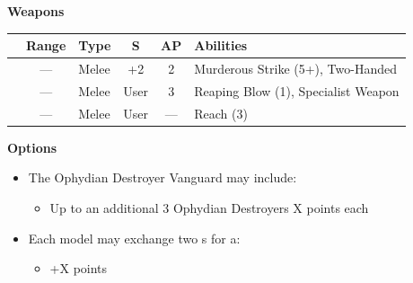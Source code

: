 \begin{minipage}[t]{0.72\textwidth}
	\vspace*{2em}
	\textbf{Weapons}
	
	\begin{tabular}{L{90 pt} c C{40pt} *{2}{c} >{\raggedright\arraybackslash}p{130pt}}
		& Range & Type & S & AP & Abilities \\
		\hline
		 & — & Melee & +2 & 2 & Murderous Strike (5+), Two-Handed \\
		 & — & Melee & User & 3 & Reaping Blow (1), Specialist Weapon \\
		 & — & Melee & User & — & Reach (3) \\
	\end{tabular}
	
	\vspace*{2em}
	\textbf{Options}
	\begin{itemize}
		\item The Ophydian Destroyer Vanguard may include:
		\begin{itemize}
			\item Up to an additional 3 Ophydian Destroyers \dotfill X points each
		\end{itemize}
		\item Each model may exchange two s for a:
		\begin{itemize}
			\item {} \dotfill +X points
		\end{itemize}
	\end{itemize}
\end{minipage}


\newpage
\subsubsection[Lokhust Destroyer Clave]{}

